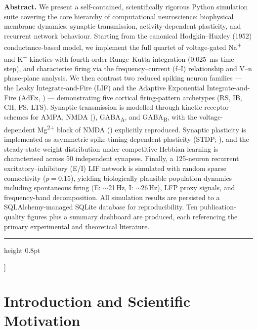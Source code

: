 \documentclass[11pt, a4paper, twocolumn]{article}
\newcommand{\Hz}{\ensuremath{\,\mathrm{Hz}}}
\begin{document}
{\begin{@twocolumnfalse}
\begin{center}
\begin{minipage}{0.88\textwidth}
\small
\textbf{Abstract.}
We present a self-contained, scientifically rigorous Python simulation suite
covering the core hierarchy of computational neuroscience: biophysical
membrane dynamics, synaptic transmission, activity-dependent plasticity, and
recurrent network behaviour. Starting from the canonical Hodgkin--Huxley
(1952) conductance-based model, we implement the full quartet of
voltage-gated Na\textsuperscript{+} and K\textsuperscript{+} kinetics with
fourth-order Runge--Kutta integration (\SI{0.025}{\milli\second} time-step),
and characterise firing via the frequency--current (f--I) relationship and
V--n phase-plane analysis. We then contrast two reduced spiking neuron
families --- the Leaky Integrate-and-Fire (LIF) and the Adaptive Exponential
Integrate-and-Fire (AdEx, \citealt{Brette2005}) --- demonstrating five
cortical firing-pattern archetypes (RS, IB, CH, FS, LTS). Synaptic
transmission is modelled through kinetic receptor schemes for AMPA, NMDA
(\citealt{Destexhe1994}), GABA\textsubscript{A}, and GABA\textsubscript{B},
with the voltage-dependent Mg\textsuperscript{2+} block of NMDA
(\citealt{Jahr1990}) explicitly reproduced. Synaptic plasticity is implemented
as asymmetric spike-timing-dependent plasticity (STDP; \citealt{Bi1998}), and
the steady-state weight distribution under competitive Hebbian learning is
characterised across 50 independent synapses. Finally, a 125-neuron recurrent
excitatory--inhibitory (E/I) LIF network is simulated with random sparse
connectivity ($p = 0.15$), yielding biologically plausible population dynamics
including spontaneous firing (E: $\sim$21\Hz, I: $\sim$26\Hz), LFP proxy
signals, and frequency-band decomposition. All simulation results are
persisted to a SQLAlchemy-managed SQLite database for reproducibility.
Ten publication-quality figures plus a summary dashboard are produced, each
referencing the primary experimental and theoretical literature.
\end{minipage}

\vspace{8pt}
\hrule height 0.8pt
\vspace{12pt}
\end{center}
\end{@twocolumnfalse}
}]

\section{Introduction and Scientific Motivation}
\label{sec:intro}
\end{document}
